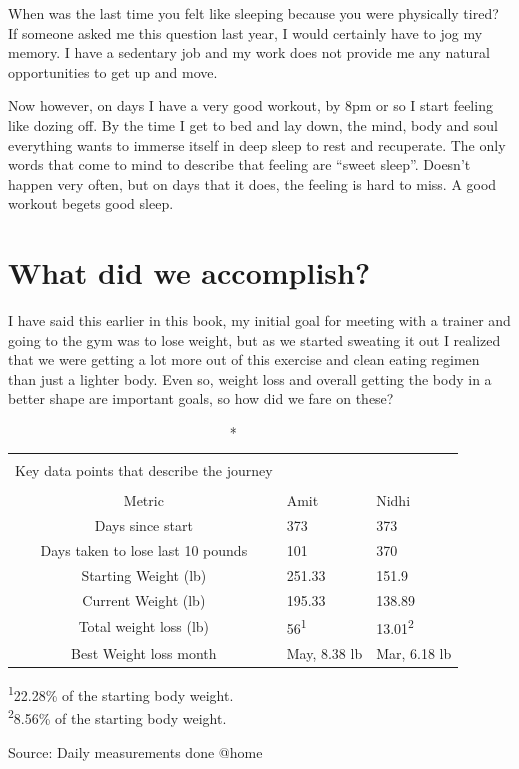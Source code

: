 \documentclass[
  oneside]{book}
\begin{document}
When was the last time you felt like sleeping because you were physically tired? If someone asked me this question last year, I would certainly have to jog my memory. I have a sedentary job and my work does not provide me any natural opportunities to get up and move.

Now however, on days I have a very good workout, by 8pm or so I start feeling like dozing off. By the time I get to bed and lay down, the mind, body and soul everything wants to immerse itself in deep sleep to rest and recuperate. The only words that come to mind to describe that feeling are ``sweet sleep''. Doesn't happen very often, but on days that it does, the feeling is hard to miss. A good workout begets good sleep.

\hypertarget{what-did-we-accomplish}{%
\chapter{What did we accomplish?}\label{what-did-we-accomplish}}

I have said this earlier in this book, my initial goal for meeting with a trainer and going to the gym was to lose weight, but as we started sweating it out I realized that we were getting a lot more out of this exercise and clean eating regimen than just a lighter body. Even so, weight loss and overall getting the body in a better shape are important goals, so how did we fare on these?

\captionsetup[table]{labelformat=empty,skip=1pt}
\begin{longtable}{cll}
\caption*{
\large \textbf{Important Metrics}\\ 
\small Key data points that describe the journey\\ 
} \\ 
\toprule
Metric & Amit & Nidhi \\ 
\midrule
Days since start & 373 & 373 \\ 
Days taken to lose last 10 pounds & 101 & 370 \\ 
Starting Weight (lb) & 251.33 & 151.9 \\ 
Current Weight (lb) & 195.33 & 138.89 \\ 
Total weight loss (lb) & 56\textsuperscript{1} & 13.01\textsuperscript{2} \\ 
Best Weight loss month & May, 8.38 lb & Mar, 6.18 lb \\ 
\bottomrule
\end{longtable}
\vspace{-5mm}
\begin{minipage}{\linewidth}
\textsuperscript{1}22.28\% of the starting body weight. \\ 
\textsuperscript{2}8.56\% of the starting body weight. \\ 
\end{minipage}
\begin{minipage}{\linewidth}
Source: Daily measurements done @home\\ 
\end{minipage}
\end{document}

